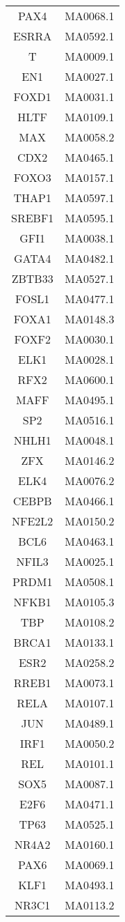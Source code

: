 \begin{supertabular}{cc}
PAX4 & MA0068.1\\
ESRRA & MA0592.1\\
T & MA0009.1\\
EN1 & MA0027.1\\
FOXD1 & MA0031.1\\
HLTF & MA0109.1\\
MAX & MA0058.2\\
CDX2 & MA0465.1\\
FOXO3 & MA0157.1\\
THAP1 & MA0597.1\\
SREBF1 & MA0595.1\\
GFI1 & MA0038.1\\
GATA4 & MA0482.1\\
ZBTB33 & MA0527.1\\
FOSL1 & MA0477.1\\
FOXA1 & MA0148.3\\
FOXF2 & MA0030.1\\
ELK1 & MA0028.1\\
RFX2 & MA0600.1\\
MAFF & MA0495.1\\
SP2 & MA0516.1\\
NHLH1 & MA0048.1\\
ZFX & MA0146.2\\
ELK4 & MA0076.2\\
CEBPB & MA0466.1\\
NFE2L2 & MA0150.2\\
BCL6 & MA0463.1\\
NFIL3 & MA0025.1\\
PRDM1 & MA0508.1\\
NFKB1 & MA0105.3\\
TBP & MA0108.2\\
BRCA1 & MA0133.1\\
ESR2 & MA0258.2\\
RREB1 & MA0073.1\\
RELA & MA0107.1\\
JUN & MA0489.1\\
IRF1 & MA0050.2\\
REL & MA0101.1\\
SOX5 & MA0087.1\\
E2F6 & MA0471.1\\
TP63 & MA0525.1\\
NR4A2 & MA0160.1\\
PAX6 & MA0069.1\\
KLF1 & MA0493.1\\
NR3C1 & MA0113.2\\

\end{supertabular}
